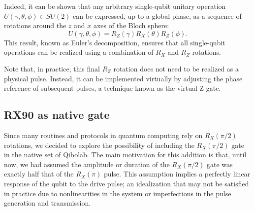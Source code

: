 Indeed, it can be shown that any arbitrary single-qubit unitary operation $ U(\gamma, \theta, \phi) \in SU(2) $ can be expressed, up to a global phase, as a sequence of rotations around the $z$ and $x$ axes of the Bloch sphere:
\begin{equation}
U(\gamma, \theta, \phi) = R_Z(\gamma) R_X(\theta) R_Z(\phi).
\end{equation}
This result, known as Euler's decomposition, ensures that all single-qubit operations can be realized using a combination of $ R_X $ and $ R_Z $ rotations. 

Note that, in practice, this final $R_Z$ rotation does not need to be realized as a physical pulse. 
Instead, it can be implemented virtually by adjusting the phase reference of subsequent pulses, a technique known as the virtual-Z gate\cite{McKay_2017}. \\

\subsection{RX90 as native gate}
Since many routines and protocols in quantum computing rely on $R_X(\pi/2)$ rotations, we decided to explore the possibility of including the $R_X(\pi/2)$ gate in the native set of Qibolab.
The main motivation for this addition is that, until now, we had assumed the amplitude or duration of the $R_X(\pi/2)$ gate was exactly half that of the $R_X(\pi)$ pulse.
This assumption implies a perfectly linear response of the qubit to the drive pulse; an idealization that may not be satisfied in practice due to nonlinearities in the system or imperfections in the pulse generation and transmission.

